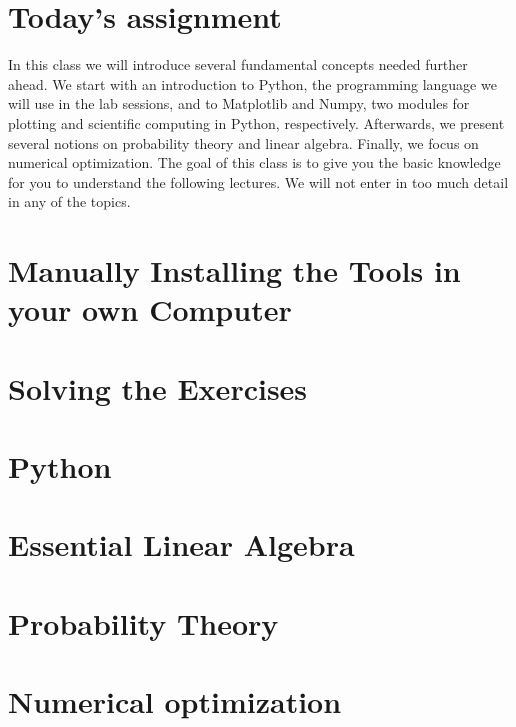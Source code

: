 
\section{Today's assignment}

In this class we will introduce several fundamental concepts needed further
ahead. We start with an introduction to Python, the programming language we
will use in the lab sessions, and to Matplotlib and Numpy, two modules for
plotting and scientific computing in Python, respectively. Afterwards, we
present several notions on probability theory and linear algebra. Finally, we
focus on numerical optimization. The goal of this class is to give you the
basic knowledge for you to understand the following lectures. We will not enter
in too much detail in any of the topics.  

\section{Manually Installing the Tools in your own Computer}


\section{Solving the Exercises}
\label{sec:SolvingExercises}


\section{Python}
\label{sec:Python}


\section{Essential Linear Algebra}


\section{Probability Theory}


\section{Numerical optimization\label{numerical_optimization}}


